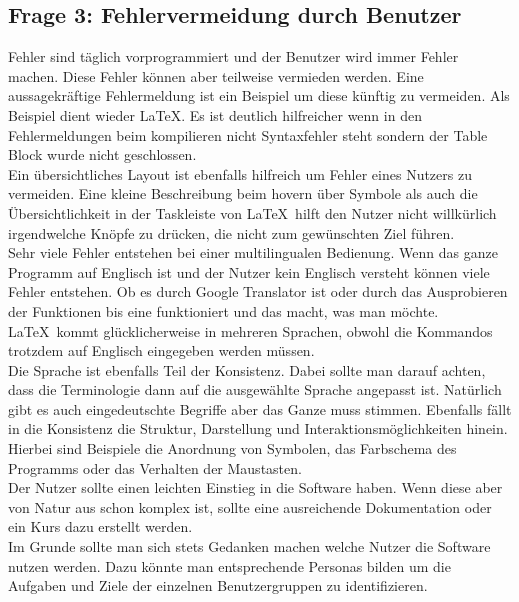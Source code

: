 \documentclass{TUBAFarbeiten}
\begin{document}
\subsection{Frage 3: Fehlervermeidung durch Benutzer}
Fehler sind täglich vorprogrammiert und der Benutzer wird immer Fehler machen. Diese Fehler können aber teilweise vermieden werden. Eine aussagekräftige Fehlermeldung ist ein Beispiel um diese künftig zu vermeiden. Als Beispiel dient wieder \LaTeX. Es ist deutlich hilfreicher wenn in den Fehlermeldungen beim kompilieren nicht \glqq Syntaxfehler\grqq{} steht sondern \glqq der Table Block wurde nicht geschlossen\grqq{}. \\
Ein übersichtliches Layout ist ebenfalls hilfreich um Fehler eines Nutzers zu vermeiden. Eine kleine Beschreibung beim hovern über Symbole als auch die Übersichtlichkeit in der Taskleiste von \LaTeX\ hilft den Nutzer nicht willkürlich irgendwelche Knöpfe zu drücken, die nicht zum gewünschten Ziel führen. \\
Sehr viele Fehler entstehen bei einer multilingualen Bedienung. Wenn das ganze Programm auf Englisch ist und der Nutzer kein Englisch versteht können viele Fehler entstehen. Ob es durch Google Translator ist oder durch das Ausprobieren der Funktionen bis eine funktioniert und das macht, was man möchte. \LaTeX\ kommt glücklicherweise in mehreren Sprachen, obwohl die Kommandos trotzdem auf Englisch eingegeben werden müssen. \\
Die Sprache ist ebenfalls Teil der Konsistenz. Dabei sollte man darauf achten, dass die Terminologie dann auf die ausgewählte Sprache angepasst ist. Natürlich gibt es auch \glqq eingedeutschte\grqq{} Begriffe aber das Ganze muss stimmen. Ebenfalls fällt in die Konsistenz die Struktur, Darstellung und Interaktionsmöglichkeiten hinein. Hierbei sind Beispiele die Anordnung von Symbolen, das Farbschema des Programms oder das Verhalten der Maustasten. \\
Der Nutzer sollte einen leichten Einstieg in die Software haben. Wenn diese aber von Natur aus schon komplex ist, sollte eine ausreichende Dokumentation oder ein Kurs dazu erstellt werden. \\
Im Grunde sollte man sich stets Gedanken machen welche Nutzer die Software nutzen werden. Dazu könnte man entsprechende Personas bilden um die Aufgaben und Ziele der einzelnen Benutzergruppen zu identifizieren.

\newpage
\end{document}

